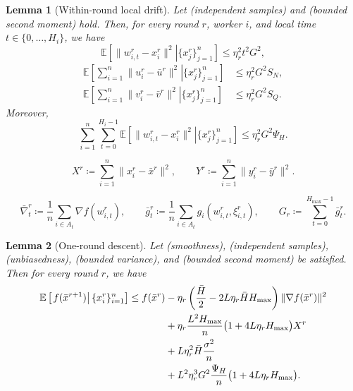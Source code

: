 \documentclass[10pt,a4paper]{amsart}
\newtheorem{lemma}{Lemma}
\newcommand{\ExpCond}[2]{{\mathbb{E}}\left[\left.#1\right\vert#2\right]}
\newcommand{\eqdef}{\coloneqq}
\begin{document}
\begin{lemma}[Within-round local drift]\label{lem:within-round-drift}Let  (independent samples) and  (bounded second moment) hold. Then, for every round \(r\), worker \(i\), and local time \(t\in\{0,\dots,H_i\}\), we have
\begin{equation} \label{eq:W_bound_delay}
\ExpCond{ \|w_{i,t}^r-x_i^r\|^2 }{ \{x_j^r\}_{j=1}^n }
\leq
\eta_r^2 t^2 G^2,
\end{equation}
\begin{align}
\ExpCond{\sum_{i=1}^n \|u_i^r-\bar u^r\|^2 }{ \{x_j^r\}_{j=1}^n }
&\leq
\eta_r^2 G^2 S_N,
\label{eq:U_bound_delay}
\\
\ExpCond{\sum_{i=1}^n \|v_i^r-\bar v^r\|^2 }{ \{x_j^r\}_{j=1}^n }
&\leq
\eta_r^2 G^2 S_Q.
\label{eq:V_bound_delay}
\end{align}
Moreover,
\begin{equation}
\sum_{i=1}^n\sum_{t=0}^{H_i-1}
\ExpCond{\|w_{i,t}^r-x_i^r\|^2  }{ \{x_j^r\}_{j=1}^n }
\le
\eta_r^2 G^2 \Psi_H. \label{eq:double_W_bound_delay}
\end{equation}
\end{lemma}

\begin{equation}\label{eq:-09y9yf8dy8fy098f+-0=-9g}
X^r \eqdef \sum_{i=1}^n \|x_i^r-\bar x^r\|^2, \qquad Y^r \eqdef \sum_{i=1}^n \|y_i^r-\bar y^r\|^2.
\end{equation}

\begin{equation}\label{eq:three_defs_final_lemma}
\bar\nabla_t^r \eqdef \frac{1}{n}\sum_{i\in A_t}\nabla f(w_{i,t}^r),
\qquad
\bar g_t^r \eqdef \frac{1}{n}\sum_{i\in A_t} g_i(w_{i,t}^r,\xi_{i,t}^r),
\qquad
G_r \eqdef \sum_{t=0}^{H_{\max}-1}\bar g_t^r.
\end{equation}

\begin{lemma}[One-round descent]\label{lem:explicit_one_round}Let  (smoothness),  (independent samples),  (unbiasedness),  (bounded variance), and  (bounded second moment) be satisfied. Then for every round \(r\), we have
\begin{align}
\ExpCond{ f(\bar x^{r+1}) }{ \{x_i^r\}_{i=1}^n }
\leq
f(\bar x^r)
&-
\eta_r\left(\frac{\bar H}{2}-2L\eta_r \bar H H_{\max}\right)\|\nabla f(\bar x^r)\|^2
\notag\\
&
+
\eta_r\frac{L^2H_{\max}}{n}\bigl(1+4L\eta_r H_{\max}\bigr)X^{r} \notag \\
&
+
L\eta_r^2\bar H\frac{\sigma^2}{n}
\notag\\
&
+
L^2\eta_r^3G^2\frac{\Psi_H}{n}\bigl(1+4L\eta_r H_{\max}\bigr).
\label{eq:98y80_098yu0fd_0yhgfdf}
\end{align}
\end{lemma}
\end{document}
